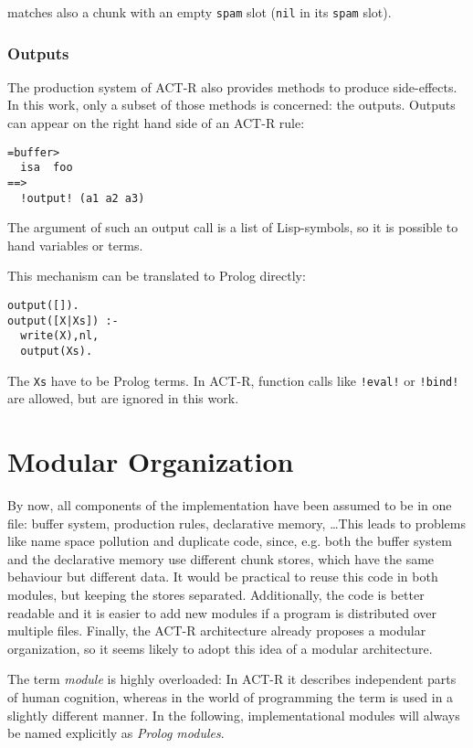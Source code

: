 matches also a chunk with an empty \lstinline|spam| slot (\lstinline|nil| in its \lstinline|spam| slot).

\subsubsection{Outputs}

The production system of ACT-R also provides methods to produce side-effects. In this work, only a subset of those methods is concerned: the outputs. Outputs can appear on the right hand side of an ACT-R rule:

\begin{lstlisting}
=buffer>
  isa  foo
==>
  !output! (a1 a2 a3)
\end{lstlisting}

The argument of such an output call is a list of Lisp-symbols, so it is possible to hand variables or terms.

This mechanism can be translated to Prolog directly:

\begin{lstlisting}
output([]).
output([X|Xs]) :-
  write(X),nl,
  output(Xs).
\end{lstlisting}

The \lstinline|Xs| have to be Prolog terms. In ACT-R, function calls like \lstinline|!eval!| or \lstinline|!bind!| are allowed, but are ignored in this work.

\section{Modular Organization}
\label{implementation:modular_organization}

By now, all components of the implementation have been assumed to be in one file: buffer system, production rules, declarative memory, \dots This leads to problems like name space pollution and duplicate code, since, e.g. both the buffer system and the declarative memory use different chunk stores, which have the same behaviour but different data. It would be practical to reuse this code in both modules, but keeping the stores separated. Additionally, the code is better readable and it is easier to add new modules if a program is distributed over multiple files. Finally, the ACT-R architecture already proposes a modular organization, so it seems likely to adopt this idea of a modular architecture.

The term \emph{module} is highly overloaded: In ACT-R it describes independent parts of human cognition, whereas in the world of programming the term is used in a slightly different manner. In the following, implementational modules will always be named explicitly as \emph{Prolog modules}.

